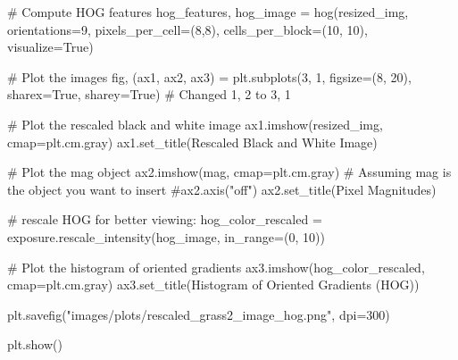 \documentclass[
  letterpaper,
]{report}
\newenvironment{Shaded}{\begin{snugshade}}{\end{snugshade}}
\newcommand{\CommentTok}[1]{\textcolor[rgb]{0.37,0.37,0.37}{#1}}
\newcommand{\DecValTok}[1]{\textcolor[rgb]{0.68,0.00,0.00}{#1}}
\newcommand{\NormalTok}[1]{\textcolor[rgb]{0.00,0.23,0.31}{#1}}
\newcommand{\OperatorTok}[1]{\textcolor[rgb]{0.37,0.37,0.37}{#1}}
\newcommand{\StringTok}[1]{\textcolor[rgb]{0.13,0.47,0.30}{#1}}
\newcommand{\VariableTok}[1]{\textcolor[rgb]{0.07,0.07,0.07}{#1}}
\begin{document}
\begin{Shaded}
\begin{Highlighting}[]
\CommentTok{\# Compute HOG features}
\NormalTok{hog\_features, hog\_image }\OperatorTok{=}\NormalTok{ hog(resized\_img, orientations}\OperatorTok{=}\DecValTok{9}\NormalTok{, pixels\_per\_cell}\OperatorTok{=}\NormalTok{(}\DecValTok{8}\NormalTok{,}\DecValTok{8}\NormalTok{),}
\NormalTok{                              cells\_per\_block}\OperatorTok{=}\NormalTok{(}\DecValTok{10}\NormalTok{, }\DecValTok{10}\NormalTok{), visualize}\OperatorTok{=}\VariableTok{True}\NormalTok{)}

\CommentTok{\# Plot the images}
\NormalTok{fig, (ax1, ax2, ax3) }\OperatorTok{=}\NormalTok{ plt.subplots(}\DecValTok{3}\NormalTok{, }\DecValTok{1}\NormalTok{, figsize}\OperatorTok{=}\NormalTok{(}\DecValTok{8}\NormalTok{, }\DecValTok{20}\NormalTok{), sharex}\OperatorTok{=}\VariableTok{True}\NormalTok{, sharey}\OperatorTok{=}\VariableTok{True}\NormalTok{)  }\CommentTok{\# Changed 1, 2 to 3, 1}

\CommentTok{\# Plot the rescaled black and white image}
\NormalTok{ax1.imshow(resized\_img, cmap}\OperatorTok{=}\NormalTok{plt.cm.gray)}
\NormalTok{ax1.set\_title(}\StringTok{\textquotesingle{}Rescaled Black and White Image\textquotesingle{}}\NormalTok{)}

\CommentTok{\# Plot the mag object}
\NormalTok{ax2.imshow(mag, cmap}\OperatorTok{=}\NormalTok{plt.cm.gray)  }\CommentTok{\# Assuming mag is the object you want to insert}
\CommentTok{\#ax2.axis("off")}
\NormalTok{ax2.set\_title(}\StringTok{\textquotesingle{}Pixel Magnitudes\textquotesingle{}}\NormalTok{)}

\CommentTok{\# rescale HOG for better viewing:}
\NormalTok{hog\_color\_rescaled }\OperatorTok{=}\NormalTok{ exposure.rescale\_intensity(hog\_image, in\_range}\OperatorTok{=}\NormalTok{(}\DecValTok{0}\NormalTok{, }\DecValTok{10}\NormalTok{))}

\CommentTok{\# Plot the histogram of oriented gradients}
\NormalTok{ax3.imshow(hog\_color\_rescaled, cmap}\OperatorTok{=}\NormalTok{plt.cm.gray)}
\NormalTok{ax3.set\_title(}\StringTok{\textquotesingle{}Histogram of Oriented Gradients (HOG)\textquotesingle{}}\NormalTok{)}

\NormalTok{plt.savefig(}\StringTok{"images/plots/rescaled\_grass2\_image\_hog.png"}\NormalTok{, dpi}\OperatorTok{=}\DecValTok{300}\NormalTok{)}

\NormalTok{plt.show()}
\end{Highlighting}
\end{Shaded}
\end{document}

